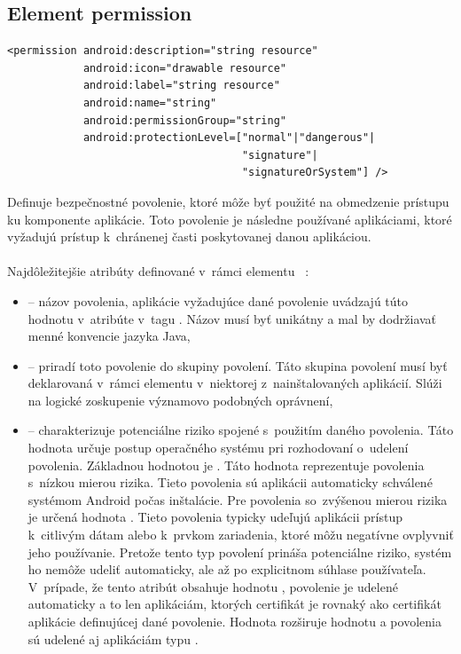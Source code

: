 \subsection{Element permission}
\lstset{language=XML}
\begin{lstlisting}
<permission android:description="string resource"
            android:icon="drawable resource"
            android:label="string resource"
            android:name="string"
            android:permissionGroup="string"
            android:protectionLevel=["normal"|"dangerous"| 
                                     "signature"|
                                     "signatureOrSystem"] />
\end{lstlisting}
Definuje bezpečnostné povolenie, ktoré môže byť použité na obmedzenie prístupu ku komponente aplikácie. Toto povolenie je následne používané aplikáciami, ktoré vyžadujú prístup k~chránenej časti poskytovanej danou aplikáciou.\\\\ \newpage Najdôležitejšie atribúty definované v~rámci elementu ~\cite{elPerm}:
\begin{itemize}
\item {} -- názov povolenia, aplikácie vyžadujúce dané povolenie uvádzajú túto hodnotu v~atribúte  v~tagu . Názov musí byť unikátny a mal by dodržiavať menné konvencie jazyka Java,
\item {} -- priradí toto povolenie do skupiny povolení. Táto skupina povolení musí byť deklarovaná v~rámci elementu  v~niektorej z~nainštalovaných aplikácií. Slúži na logické zoskupenie významovo podobných oprávnení,
\item {} -- charakterizuje potenciálne riziko spojené s~použitím daného povolenia. Táto hodnota určuje postup operačného systému pri rozhodovaní o~udelení povolenia. 
Základnou hodnotou je . Táto hodnota reprezentuje povolenia s~nízkou mierou rizika. Tieto povolenia sú aplikácii automaticky schválené systémom Android počas inštalácie. Pre povolenia so~zvýšenou mierou rizika je určená hodnota . Tieto povolenia typicky udeľujú aplikácii prístup k~citlivým dátam alebo k~prvkom zariadenia, ktoré môžu negatívne ovplyvniť jeho používanie. Pretože tento typ povolení prináša potenciálne riziko, systém ho nemôže udeliť automaticky, ale až po explicitnom súhlase používateľa.
V~prípade, že tento atribút obsahuje hodnotu , povolenie je udelené automaticky a to len aplikáciám, ktorých certifikát je rovnaký ako certifikát aplikácie definujúcej dané povolenie.   
Hodnota  rozširuje hodnotu  a povolenia sú udelené aj aplikáciám typu .
\end{itemize}

